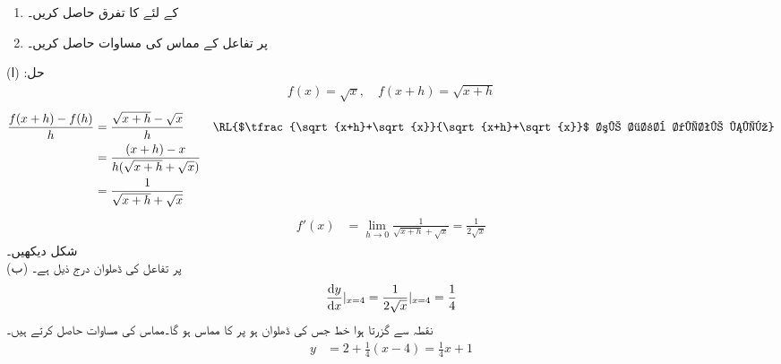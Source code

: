 \begin{enumerate}[1.]
\item
{} کے لئے  کا تفرق حاصل کریں۔
\item
{} پر تفاعل  کے مماس کی مساوات حاصل کریں۔
\end{enumerate}
حل:\quad
(ا) \quad {}\quad
\begin{align*}
f(x)=\sqrt{x},\quad f(x+h)=\sqrt{x+h}
\end{align*}
\begin{align*}
\frac{f(x+h)-f(h)}{h}&=\frac{\sqrt{x+h}-\sqrt{x}}{h}&& \text{\RL{$\tfrac{\sqrt{x+h}+\sqrt{x}}{\sqrt{x+h}+\sqrt{x}}$ سے ضرب دیتے ہیں}}\\
&=\frac{(x+h)-x}{h(\sqrt{x+h}+\sqrt{x})}\\
&=\frac{1}{\sqrt{x+h}+\sqrt{x}}
\end{align*}
\begin{align*}
f'(x)&=\lim_{h\to 0}\frac{1}{\sqrt{x+h}+\sqrt{x}}=\frac{1}{2\sqrt{x}}
\end{align*}
شکل  دیکھیں۔\\
(ب)\quad
{} پر تفاعل کی ڈھلوان درج ذیل ہے۔
\begin{align*}
\frac{\dif y}{\dif x}|_{x=4}=\frac{1}{2\sqrt{x}}|_{x=4}=\frac{1}{4}
\end{align*}
نقطہ  سے گزرتا ہوا خط جس کی ڈھلوان  ہو  پر  کا مماس ہو گا۔مماس کی مساوات حاصل کرتے ہیں۔
\begin{align*}
y&=2+\frac{1}{4}(x-4)=\frac{1}{4}x+1
\end{align*}
%
